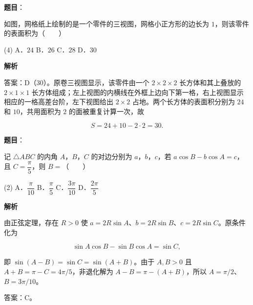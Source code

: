 \begin{answer}

\textbf{题目}：

如图，网格纸上绘制的是一个零件的三视图，网格小正方形的边长为 $1$，则该零件的表面积为\mbox{（　　）}
\nopagebreak[4]
\begin{center}\end{center}
\nopagebreak[4]
\begin{gkopts}(4)
\task A．$24$
\task B．$26$
\task C．$28$
\task D．$30$
\end{gkopts}


\textbf{解析}

答案：D（$30$）。原卷三视图显示，该零件由一个 $2\times2\times2$ 长方体和其上叠放的 $2\times1\times1$ 长方体组成；左上视图的内横线在外框上边向下第一格，右上视图显示相应的一格高差台阶，左下视图给出 $2\times2$ 占地。两个长方体的表面积分别为 $24$ 和 $10$，共用面积为 $2$ 的面被重复计算一次，故

\nopagebreak[4]
\[
S=24+10-2\cdot2=30.
\]


\end{answer}
\begin{answer}

\textbf{题目}：

记 $\triangle ABC$ 的内角 $A$，$B$，$C$ 的对边分别为 $a$，$b$，$c$，若 $a\cos B-b\cos A=c$，且 $C=\dfrac\pi5$，则 $B=$\mbox{（　　）}

\begin{gkopts}(2)
\task A．$\dfrac\pi{10}$
\task B．$\dfrac\pi5$
\task C．$\dfrac{3\pi}{10}$
\task D．$\dfrac{2\pi}5$
\end{gkopts}

\textbf{解析}

由正弦定理，存在 $R>0$ 使 $a=2R\sin A$、$b=2R\sin B$、$c=2R\sin C$。原条件化为

\nopagebreak[4]
\[
\sin A\cos B-\sin B\cos A=\sin C,
\]

即 $\sin(A-B)=\sin C=\sin(A+B)$。由于 $A,B>0$ 且 $A+B=\pi-C=4\pi/5$，非退化解为 $A-B=\pi-(A+B)$，所以 $A=\pi/2$、$B=3\pi/10$。

答案：C。


\end{answer}
